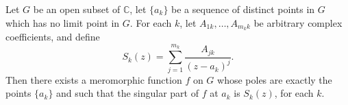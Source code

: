 \documentclass[12pt]{article}
\begin{document}
Let $G$ be an open subset of $\mathbb{C}$, let $\{a_k\}$ be a sequence of distinct points in $G$ which has no limit point in $G$. For each $k$, let 
$A_{1k},\dots,A_{m_kk}$ be arbitrary complex coefficients, and define
\[S_k(z) = \sum_{j=1}^{m_k} \frac{A_{jk}}{(z-a_k)^j}.\]
Then there exists a meromorphic function $f$ on $G$ whose poles are exactly the points $\{a_k\}$ and such that the singular part of $f$ at $a_k$ is $S_k(z)$, for each $k$.
\end{document}
